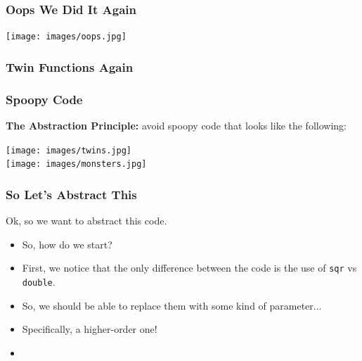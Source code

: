 \documentclass{beamer}
\begin{document}
\begin{frame}
  \frametitle{Oops We Did It Again}
  \centering \texttt{[image: images/oops.jpg]}
\end{frame}

\begin{frame}
  \frametitle{Twin Functions Again}
  \twinFunctions
\end{frame}

\begin{frame}
  \frametitle{Spoopy Code}
  \textbf{The Abstraction Principle:} avoid spoopy code that looks like the following:
  \begin{center}
    \texttt{[image: images/twins.jpg]}\\
    \texttt{[image: images/monsters.jpg]}\\
  \end{center}
\end{frame}


\begin{frame}
  \frametitle{So Let's Abstract This}
  Ok, so we want to abstract this code.
  \begin{itemize}
  \item<2-> So, how do we start?
  \item<3-> First, we notice that the only difference between the code
    is the use of \texttt{sqr} vs  \texttt{double}.
  \item<4-> So, we should be able to replace them with some kind of parameter...
  \item<5-> Specifically, a higher-order one!
  \item<6-> \doEach
  \end{itemize}
\end{frame}
\end{document}
